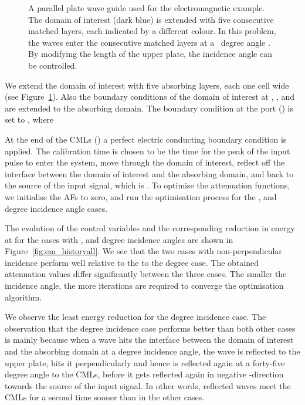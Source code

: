 \documentclass[a4paper]{article}
\begin{document}
\begin{figure}
  \centering
  \caption{A  parallel plate wave guide used for the
    electromagnetic example. The domain of interest (dark blue) is
    extended with five consecutive matched layers, each indicated by a
    different colour. In this problem, the waves enter the consecutive matched
    layers at a ~degree angle . By modifying the length of
    the upper plate, the incidence angle can be controlled.}
  \label{fig:em_domain60}
\end{figure}

We extend the domain of interest with five absorbing layers, each one
cell wide (see Figure~\ref{fig:em_domain60}). Also the boundary
conditions of the domain of interest at , ,  and
 are extended to the absorbing domain. The boundary condition
at the port () is set to , where

At the end of the CMLs () a perfect electric conducting
boundary condition is applied. The calibration time is chosen to be
the time for the peak of the input pulse to enter the system, move
through the domain of interest, reflect off the interface between the
domain of interest and the absorbing domain, and back to the source of
the input signal, which is . To
optimise the attenuation functions, we initialise the AFs to zero, and
run the optimisation process for the ,  and  degree
incidence angle cases.

The evolution of the control variables and the corresponding reduction
in energy at  for the cases with ,  and 
degree incidence angles are shown in
Figure~\ref{fig:em_historyall}. We see that the two cases with
non-perpendicular incidence perform well relative to the to the 
degree case. The obtained attenuation values differ significantly
between the three cases. The smaller the incidence angle, the more
iterations are required to converge the optimisation algorithm.

We observe the least energy reduction for the  degree incidence
case. The observation that the  degree incidence case performs
better than both other cases is mainly because when a wave hits the
interface between the domain of interest and the absorbing domain at a
 degree incidence angle, the wave is reflected to the upper plate,
hits it perpendicularly and hence is reflected again at a forty-five
degree angle to the CMLs, before it gets reflected again in negative
-direction towards the source of the input signal. In other words,
reflected waves meet the CMLs for a second time sooner than in the
other cases.
\end{document}
